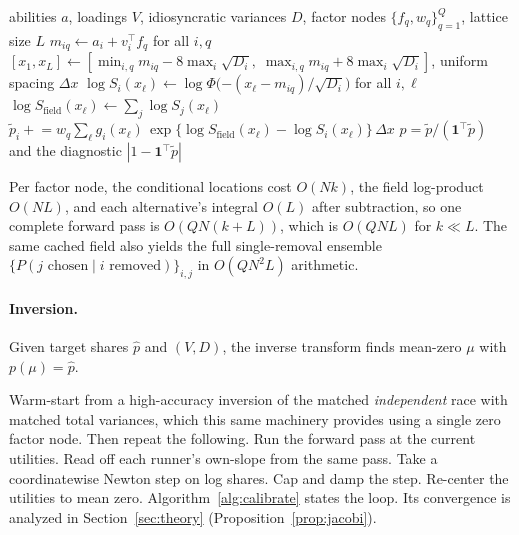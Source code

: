 \documentclass[12pt]{article}
\theoremstyle{remark}
\begin{document}
\begin{algorithm}[H]
\caption{All-share forward pass (min-wins; reflected from argmax by $a = -\mu$)}
\label{alg:forward}
\begin{algorithmic}[1]
\Require abilities $a$, loadings $V$, idiosyncratic variances $D$, factor
nodes $\{f_q, w_q\}_{q=1}^{Q}$, lattice size $L$
\State $m_{iq} \gets a_i + v_i^\top f_q$ for all $i, q$
\State $[x_1, x_L] \gets [\min_{i,q} m_{iq} - 8\max_i \sqrt{D_i},\;
\max_{i,q} m_{iq} + 8\max_i \sqrt{D_i}]$, uniform spacing $\Delta x$
  \State $\log S_i(x_\ell) \gets \log\Phi\big({-(x_\ell -
  m_{iq})}/{\sqrt{D_i}}\big)$ for all $i, \ell$
  \State $\log S_{\mathrm{field}}(x_\ell) \gets \sum_j \log
  S_j(x_\ell)$
  \State $\tilde p_i \mathrel{+}= w_q \sum_\ell g_i(x_\ell)\,
  \exp\{\log S_{\mathrm{field}}(x_\ell) - \log S_i(x_\ell)\}\,
  \Delta x$ 
\EndFor
\State \Return $p = \tilde p / (\mathbf{1}^\top \tilde p)$ and the
diagnostic $|1 - \mathbf{1}^\top \tilde p|$
\end{algorithmic}
\end{algorithm}

Per factor node, the conditional
locations cost $O(Nk)$, the field log-product $O(NL)$, and each
alternative's integral $O(L)$ after subtraction, so one complete forward
pass is $O(QN(k+L))$, which is $O(QNL)$ for $k \ll L$. The same cached
field also yields the full single-removal ensemble $\{P(j \text{ chosen}
\mid i \text{ removed})\}_{i,j}$ in $O(QN^2L)$ arithmetic.

\paragraph{Inversion.} Given target shares $\hat p$ and $(V, D)$, the
inverse transform finds mean-zero $\mu$ with $p(\mu) = \hat p$.

Warm-start from a high-accuracy inversion of
the matched \emph{independent} race with matched total variances, which this
same machinery provides using a single zero factor node. Then repeat the following. Run
the forward pass at the current utilities. Read off each runner's
own-slope from the same pass. Take a coordinatewise Newton step on log
shares. Cap and damp the step. Re-center the utilities to mean zero.
Algorithm~\ref{alg:calibrate} states the loop. Its convergence is
analyzed in Section~\ref{sec:theory} (Proposition~\ref{prop:jacobi}).
\end{document}
